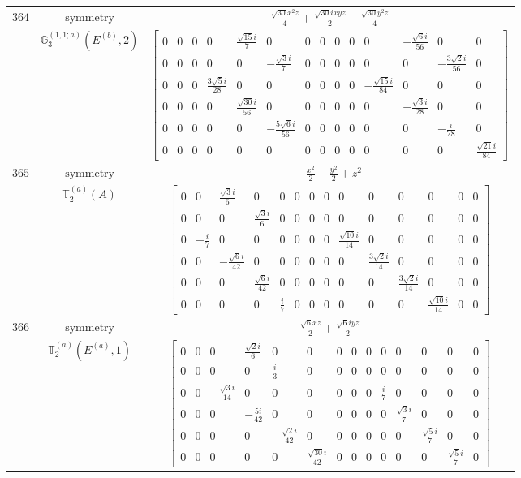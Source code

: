 \documentclass[fleqn,8pt,landscape]{jsarticle}
\begin{document}
\begin{longtable}{ccc}
$ 364 $ & $ \text{symmetry} $ & $ \frac{\sqrt{30} x^{2} z}{4} + \frac{\sqrt{30} i x y z}{2} - \frac{\sqrt{30} y^{2} z}{4} $ \\
$  $ & $ \mathbb{G}_{3}^{(1,1;a)}(E^{(b)},2) $ & $ \begin{bmatrix} 0 & 0 & 0 & 0 & \frac{\sqrt{15} i}{7} & 0 & 0 & 0 & 0 & 0 & 0 & - \frac{\sqrt{6} i}{56} & 0 & 0 \\ 0 & 0 & 0 & 0 & 0 & - \frac{\sqrt{3} i}{7} & 0 & 0 & 0 & 0 & 0 & 0 & - \frac{3 \sqrt{2} i}{56} & 0 \\ 0 & 0 & 0 & \frac{3 \sqrt{5} i}{28} & 0 & 0 & 0 & 0 & 0 & 0 & - \frac{\sqrt{15} i}{84} & 0 & 0 & 0 \\ 0 & 0 & 0 & 0 & \frac{\sqrt{30} i}{56} & 0 & 0 & 0 & 0 & 0 & 0 & - \frac{\sqrt{3} i}{28} & 0 & 0 \\ 0 & 0 & 0 & 0 & 0 & - \frac{5 \sqrt{6} i}{56} & 0 & 0 & 0 & 0 & 0 & 0 & - \frac{i}{28} & 0 \\ 0 & 0 & 0 & 0 & 0 & 0 & 0 & 0 & 0 & 0 & 0 & 0 & 0 & \frac{\sqrt{21} i}{84} \end{bmatrix} $ \\ \hline
$ 365 $ & $ \text{symmetry} $ & $ - \frac{x^{2}}{2} - \frac{y^{2}}{2} + z^{2} $ \\
$  $ & $ \mathbb{T}_{2}^{(a)}(A) $ & $ \begin{bmatrix} 0 & 0 & \frac{\sqrt{3} i}{6} & 0 & 0 & 0 & 0 & 0 & 0 & 0 & 0 & 0 & 0 & 0 \\ 0 & 0 & 0 & \frac{\sqrt{3} i}{6} & 0 & 0 & 0 & 0 & 0 & 0 & 0 & 0 & 0 & 0 \\ 0 & - \frac{i}{7} & 0 & 0 & 0 & 0 & 0 & 0 & \frac{\sqrt{10} i}{14} & 0 & 0 & 0 & 0 & 0 \\ 0 & 0 & - \frac{\sqrt{6} i}{42} & 0 & 0 & 0 & 0 & 0 & 0 & \frac{3 \sqrt{2} i}{14} & 0 & 0 & 0 & 0 \\ 0 & 0 & 0 & \frac{\sqrt{6} i}{42} & 0 & 0 & 0 & 0 & 0 & 0 & \frac{3 \sqrt{2} i}{14} & 0 & 0 & 0 \\ 0 & 0 & 0 & 0 & \frac{i}{7} & 0 & 0 & 0 & 0 & 0 & 0 & \frac{\sqrt{10} i}{14} & 0 & 0 \end{bmatrix} $ \\ \hline
$ 366 $ & $ \text{symmetry} $ & $ \frac{\sqrt{6} x z}{2} + \frac{\sqrt{6} i y z}{2} $ \\
$  $ & $ \mathbb{T}_{2}^{(a)}(E^{(a)},1) $ & $ \begin{bmatrix} 0 & 0 & 0 & \frac{\sqrt{2} i}{6} & 0 & 0 & 0 & 0 & 0 & 0 & 0 & 0 & 0 & 0 \\ 0 & 0 & 0 & 0 & \frac{i}{3} & 0 & 0 & 0 & 0 & 0 & 0 & 0 & 0 & 0 \\ 0 & 0 & - \frac{\sqrt{3} i}{14} & 0 & 0 & 0 & 0 & 0 & 0 & \frac{i}{7} & 0 & 0 & 0 & 0 \\ 0 & 0 & 0 & - \frac{5 i}{42} & 0 & 0 & 0 & 0 & 0 & 0 & \frac{\sqrt{3} i}{7} & 0 & 0 & 0 \\ 0 & 0 & 0 & 0 & - \frac{\sqrt{2} i}{42} & 0 & 0 & 0 & 0 & 0 & 0 & \frac{\sqrt{5} i}{7} & 0 & 0 \\ 0 & 0 & 0 & 0 & 0 & \frac{\sqrt{30} i}{42} & 0 & 0 & 0 & 0 & 0 & 0 & \frac{\sqrt{5} i}{7} & 0 \end{bmatrix} $ \\ \hline

\end{longtable}
\end{document}
